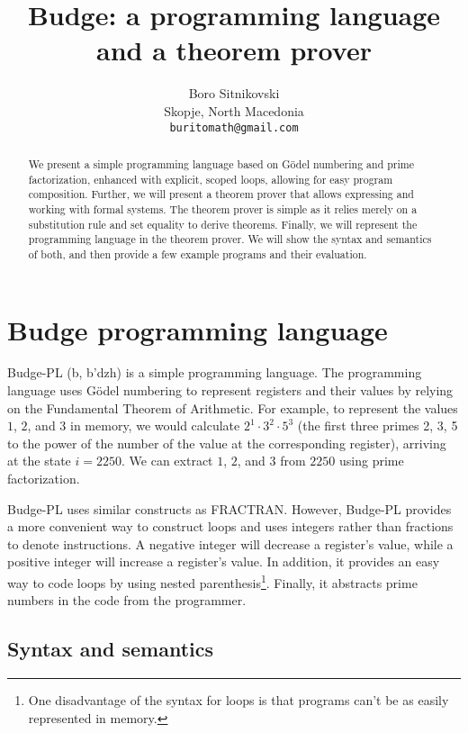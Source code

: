 \documentclass{article}
\title{Budge: a programming language and a theorem prover}
\author{
  Boro Sitnikovski \\
  Skopje, North Macedonia \\
  \texttt{buritomath@gmail.com} \\
}
\begin{document}
\maketitle

\begin{abstract}
We present a simple programming language based on Gödel numbering and prime factorization, enhanced with explicit, scoped loops, allowing for easy program composition. Further, we will present a theorem prover that allows expressing and working with formal systems. The theorem prover is simple as it relies merely on a substitution rule and set equality to derive theorems. Finally, we will represent the programming language in the theorem prover. We will show the syntax and semantics of both, and then provide a few example programs and their evaluation.
\end{abstract}


\section{Budge programming language}

Budge-PL (b\textturnv\textdyoghlig, b'dzh) is a simple programming language. The programming language uses Gödel numbering\cite{b1} to represent registers and their values by relying on the Fundamental Theorem of Arithmetic\cite{b2}. For example, to represent the values $1$, $2$, and $3$ in memory, we would calculate $2^1 \cdot 3^2 \cdot 5^3$ (the first three primes 2, 3, 5 to the power of the number of the value at the corresponding register), arriving at the state $i = 2250$. We can extract $1$, $2$, and $3$ from $2250$ using prime factorization.

Budge-PL uses similar constructs as FRACTRAN\cite{b3}. However, Budge-PL provides a more convenient way to construct loops and uses integers rather than fractions to denote instructions. A negative integer will decrease a register's value, while a positive integer will increase a register's value. In addition, it provides an easy way to code loops by using nested parenthesis\footnote{One disadvantage of the syntax for loops is that programs can't be as easily represented in memory.}. Finally, it abstracts prime numbers in the code from the programmer.

\subsection{Syntax and semantics}
\end{document}
